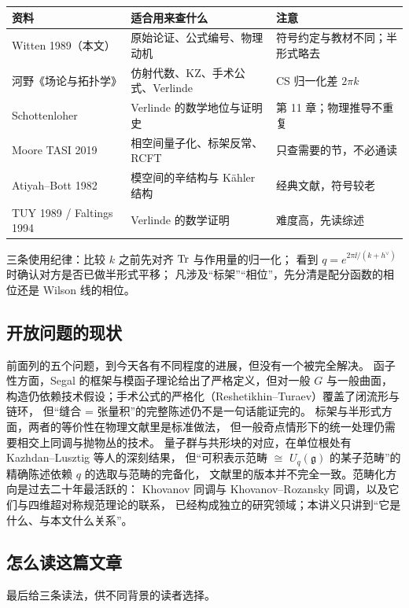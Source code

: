 \begin{center}
\small
\begin{tabular}{@{}p{3.0cm}p{5.7cm}p{5.4cm}@{}}
\toprule
资料 & 适合用来查什么 & 注意 \\
\midrule
Witten 1989（本文） & 原始论证、公式编号、物理动机 & 符号约定与教材不同；半形式略去 \\
河野《场论与拓扑学》 & 仿射代数、KZ、手术公式、Verlinde & CS 归一化差 $2\pi k$ \\
Schottenloher & Verlinde 的数学地位与证明史 & 第 11 章；物理推导不重复 \\
Moore TASI 2019 & 相空间量子化、标架反常、RCFT & 只查需要的节，不必通读 \\
Atiyah--Bott 1982 & 模空间的辛结构与 Kähler 结构 & 经典文献，符号较老 \\
TUY 1989 / Faltings 1994 & Verlinde 的数学证明 & 难度高，先读综述 \\
\bottomrule
\end{tabular}
\end{center}

\noindent 三条使用纪律：比较 $k$ 之前先对齐 $\operatorname{Tr}$ 与作用量的归一化；
看到 $q=e^{2\pi\ii/(k+h^\vee)}$ 时确认对方是否已做半形式平移；
凡涉及“标架”“相位”，先分清是配分函数的相位还是 Wilson 线的相位。

\subsection{开放问题的现状}

前面列的五个问题，到今天各有不同程度的进展，但没有一个被完全解决。
函子性方面，Segal 的框架与模函子理论给出了严格定义，但对一般 $G$ 与一般曲面，
构造仍依赖技术假设；手术公式的严格化（Reshetikhin--Turaev）覆盖了闭流形与链环，
但“缝合 = 张量积”的完整陈述仍不是一句话能证完的。
标架与半形式方面，两者的等价性在物理文献里是标准做法，
但一般奇点情形下的统一处理仍需要相交上同调与抛物丛的技术。
量子群与共形块的对应，在单位根处有 Kazhdan--Lusztig 等人的深刻结果，
但“可积表示范畴 $\cong$ $U_q(\mathfrak g)$ 的某子范畴”的精确陈述依赖 $q$ 的选取与范畴的完备化，
文献里的版本并不完全一致。范畴化方向是过去二十年最活跃的：
Khovanov 同调与 Khovanov--Rozansky 同调，以及它们与四维超对称规范理论的联系，
已经构成独立的研究领域；本讲义只讲到“它是什么、与本文什么关系”。

\subsection{怎么读这篇文章}

最后给三条读法，供不同背景的读者选择。

